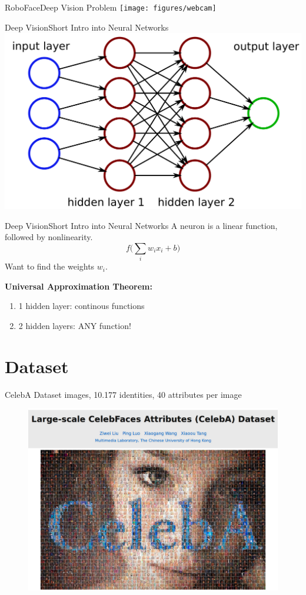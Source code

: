 \documentclass{beamer}
\begin{document}
\begin{frame}{RoboFace}{Deep Vision Problem}
		\vspace*{-11.6mm}
		\hspace*{2.85cm}
		\texttt{[image: figures/webcam]}
\end{frame}

\begin{frame}{Deep Vision}{Short Intro into Neural Networks}
	\centering
	\includegraphics[width=0.61\linewidth]{figures/hiddenLayers}
\end{frame}

\begin{frame}{Deep Vision}{Short Intro into Neural Networks}
	A neuron is a linear function, followed by nonlinearity.
	$$f\Big(\sum_i w_ix_i +b\Big)$$
	Want to find the weights $w_i$.
	
	\vspace{5mm}
	\textbf{Universal Approximation Theorem:}
	\begin{enumerate}
		\item 1 hidden layer: continous functions
		\item 2 hidden layers: ANY function!
	\end{enumerate}
\end{frame}

\section{Dataset}
\begin{frame}{CelebA Dataset \cite{website}}
 images,
	10.177 identities,
	40 attributes per image 
	\begin{figure}
		\centering
		\includegraphics[width=0.9\linewidth]{figures/CelebA}
		\label{fig:celebA}
	\end{figure}
\end{frame}
\end{document}
